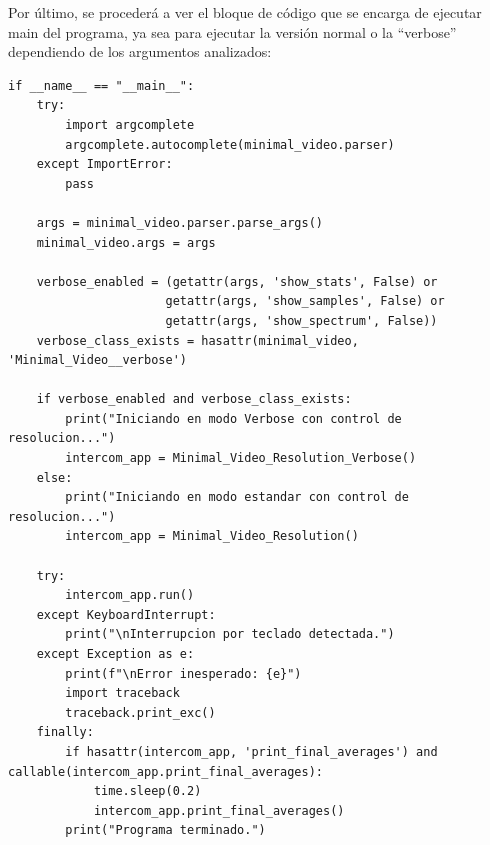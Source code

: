 Por último, se procederá a ver el bloque de código que se encarga de ejecutar main del programa, ya sea para ejecutar la versión normal o la ``verbose'' dependiendo de los argumentos analizados:
\begin{lstlisting}[style=pythonstyle, caption={Bloque de código del main del módulo \textit{Minimal\_Video\_Resolution.py}}, label={lst:bloque_codigo_principal}]
if __name__ == "__main__":
    try:
        import argcomplete
        argcomplete.autocomplete(minimal_video.parser)
    except ImportError:
        pass

    args = minimal_video.parser.parse_args()
    minimal_video.args = args

    verbose_enabled = (getattr(args, 'show_stats', False) or
                      getattr(args, 'show_samples', False) or
                      getattr(args, 'show_spectrum', False))
    verbose_class_exists = hasattr(minimal_video, 'Minimal_Video__verbose')

    if verbose_enabled and verbose_class_exists:
        print("Iniciando en modo Verbose con control de resolucion...")
        intercom_app = Minimal_Video_Resolution_Verbose()
    else:
        print("Iniciando en modo estandar con control de resolucion...")
        intercom_app = Minimal_Video_Resolution()

    try:
        intercom_app.run()
    except KeyboardInterrupt:
        print("\nInterrupcion por teclado detectada.")
    except Exception as e:
        print(f"\nError inesperado: {e}")
        import traceback
        traceback.print_exc()
    finally:
        if hasattr(intercom_app, 'print_final_averages') and callable(intercom_app.print_final_averages):
            time.sleep(0.2)
            intercom_app.print_final_averages()
        print("Programa terminado.")
\end{lstlisting}
\vspace{\baselineskip}

